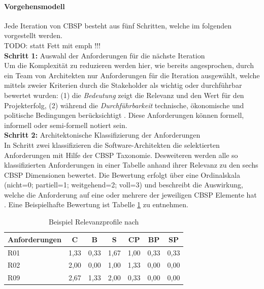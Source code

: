 \paragraph{Vorgehensmodell} 
Jede Iteration von CBSP besteht aus fünf Schritten, welche im folgenden vorgestellt werden. \\

TODO: statt Fett mit emph !!! \\

\textbf{Schritt 1:} Auswahl der Anforderungen für die nächste Iteration \\
Um die Komplexität zu reduzieren werden hier, wie bereits angesprochen, durch ein Team von Architekten nur Anforderungen für die Iteration ausgewählt, welche mittels zweier Kriterien durch die Stakeholder als wichtig oder durchführbar bewertet wurden: (1) die \textit{Bedeutung} zeigt die Relevanz und den Wert für den Projekterfolg, (2) während die \textit{Durchführbarkeit} technische, ökonomische und politische Bedingungen berücksichtigt \cite{Gru01}. Diese Anforderungen können formell, informell oder semi-formell notiert sein. \\

\textbf{Schritt 2:} Architektonische Klassifizierung der Anforderungen \\
In Schritt zwei klassifizieren die Software-Architekten die selektierten Anforderungen mit Hilfe der CBSP Taxonomie. Desweiteren werden alle so klassifizierten Anforderungen in einer Tabelle anhand ihrer Relevanz zu den sechs CBSP Dimensionen bewertet. Die Bewertung erfolgt über eine Ordinalskala (nicht=0; partiell=1; weitgehend=2; voll=3) und beschreibt die Auswirkung, welche die Anforderung auf eine oder mehrere der jeweiligen CBSP Elemente hat \cite{Gru01}. Eine Beispielhafte Bewertung ist Tabelle \ref{tab:relevance_profiles} zu entnehmen. 

\begin{table}[h] %
\caption{Beispiel Relevanzprofile nach \cite{Gru01}}
\centering
\begin{tabular}{|l|c|c|c|c|c|c|}
\hline 
\rule[-1ex]{0pt}{2.5ex} \textbf{Anforderungen} & \textbf{C} & \textbf{B} & \textbf{S} & \textbf{CP} & \textbf{BP} & \textbf{SP} \\ 
\hline 
\rule[-1ex]{0pt}{2.5ex} R01 & 1,33 & 0,33 & \cellcolor{Gray} 1,67 & 1,00 & 0,33 & 0,33 \\ 
\hline 
\rule[-1ex]{0pt}{2.5ex} R02 & \cellcolor{Gray} 2,00 & 0,00 & 1,00 & 1,33 & 0,00 & 0,00 \\ 
\hline 
\rule[-1ex]{0pt}{2.5ex} R09 & \cellcolor{Gray} 2,67 & 1,33 & 2,00 & 0,33 & 0,00 & 0,00 \\ 
\hline 
\end{tabular} 
\label{tab:relevance_profiles}
\end{table}

